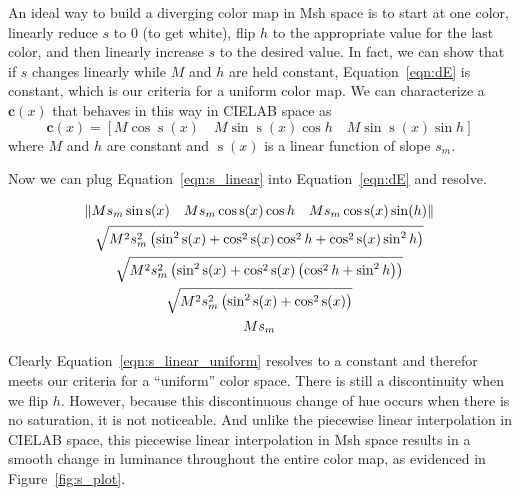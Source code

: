 \documentclass{acmsiggraph}               %
\newcommand{\Lab}{CIELAB\xspace}
\newcommand{\Msh}{Msh\xspace}
\newcommand*{\cvec}[1]{\mathbf{#1}}
\begin{document}
An ideal way to build a diverging color map in \Msh space is to start at
one color, linearly reduce $s$ to 0 (to get white), flip $h$ to the
appropriate value for the last color, and then linearly increase $s$ to the
desired value.  In fact, we can show that if $s$ changes linearly while $M$
and $h$ are held constant, Equation~\ref{eqn:dE} is constant, which is our
criteria for a uniform color map.  We can characterize a $\cvec{c}(x)$ that
behaves in this way in \Lab space as
\begin{equation}
  \cvec{c}(x) = [ M \cos \operatorname{s}(x) \quad
  M \sin \operatorname{s}(x) \cos h \quad
  M \sin \operatorname{s}(x) \sin h ]
  \label{eqn:s_linear}
\end{equation}
where $M$ and $h$ are constant and $\operatorname{s}(x)$ is a linear
function of slope $s_m$.

Now we can plug Equation~\ref{eqn:s_linear} into Equation~\ref{eqn:dE} and
resolve.

\begin{equation}
  \begin{gathered}
    \left\lVert M s_m \sin\operatorname{s}(x) \quad
        M s_m \cos\operatorname{s}(x) \cos h \quad
        M s_m \cos\operatorname{s}(x) \sin(h) \right\rVert \\
    \sqrtsign{ M^2 s_m^2 \left( \sin^2 \operatorname{s}(x)
        + \cos^2 \operatorname{s}(x) \cos^2 h
        + \cos^2 \operatorname{s}(x) \sin^2 h \right) } \\
    \sqrtsign{ M^2 s_m^2 \left( \sin^2 \operatorname{s}(x)
        + \cos^2 \operatorname{s}(x) \left( \cos^2 h
          + \sin^2 h \right) \right) } \\
    \sqrtsign{ M^2 s_m^2 \left( \sin^2 \operatorname{s}(x)
        + \cos^2 \operatorname{s}(x) \right) } \\
    M s_m
    \label{eqn:s_linear_uniform}
  \end{gathered}
\end{equation}

Clearly Equation~\ref{eqn:s_linear_uniform} resolves to a constant and
therefor meets our criteria for a ``uniform'' color space.  There is still
a discontinuity when we flip $h$.  However, because this discontinuous
change of hue occurs when there is no saturation, it is not noticeable.
And unlike the piecewise linear interpolation in \Lab space, this piecewise
linear interpolation in \Msh space results in a smooth change in luminance
throughout the entire color map, as evidenced in Figure~\ref{fig:s_plot}.
\end{document}
